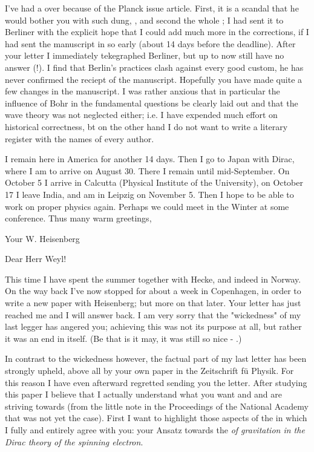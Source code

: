 \documentclass{article}
\begin{document}
I've had a  over  because of the Planck issue article. First, it is a scandal that he would bother you with such dung, , and second the whole ; I had sent it to Berliner with the explicit hope that I could add much more in the corrections, if I had sent the manuscript in so early (about 14 days before the deadline). After your letter I immediately tekegraphed Berliner, but up to now still have no answer (!). I find that Berlin's practices clash against every good custom, he has never confirmed the reciept of the manuscript. Hopefully you have made quite a few changes in the manuscript. I was rather anxious that in particular the influence of Bohr in the fundamental questions be clearly laid out and that the wave theory was not neglected either; i.e. I have expended much effort on historical correctness, bt on the other hand I do not want to write a literary register with the names of every author.

I remain here in America for another 14 days. Then I go to Japan with Dirac, where I am to arrive on August 30. There I remain until mid-September. On October 5 I arrive in Calcutta (Physical Institute of the University), on October 17 I leave India, and am in Leipzig on November 5. Then I hope to be able to work on proper physics again. Perhaps we could meet in the Winter at some conference. Thus many warm greetings,

Your
W. Heisenberg

\date{August 26, 1929}

Dear Herr Weyl!

This time I have spent the summer together with Hecke, and indeed in Norway. On the way back I've now stopped for about a week in Copenhagen, in order to write a new paper with Heisenberg; but more on that later. Your letter has just reached me and I will  answer back. I am very sorry that the "wickedness" of my last legger has angered you; achieving this was not its purpose at all, but rather it was an end in itself. (Be that is it may, it was still so nice - .)

In contrast to the wickedness however, the factual part of my last letter has been strongly upheld, above all by your own paper in the Zeitschrift f\"u Physik. For this reason I have even afterward regretted sending you the letter. After studying this paper I believe that I actually understand what you want and and are striving towards (from the little note in the Proceedings of the National Academy that was not yet the case). First I want to highlight those aspects of the  in which I fully and entirely agree with you: your Ansatz towards the \textit{ of gravitation in the Dirac theory of the spinning electron}.
\end{document}
